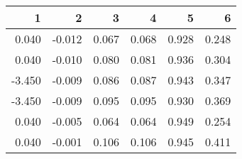 \begin{table}[ht]
\centering
\begin{tabular}{rrrrrr}
  \hline
1 & 2 & 3 & 4 & 5 & 6 \\ 
  \hline
0.040 & -0.012 & 0.067 & 0.068 & 0.928 & 0.248 \\ 
  0.040 & -0.010 & 0.080 & 0.081 & 0.936 & 0.304 \\ 
  -3.450 & -0.009 & 0.086 & 0.087 & 0.943 & 0.347 \\ 
  -3.450 & -0.009 & 0.095 & 0.095 & 0.930 & 0.369 \\ 
  0.040 & -0.005 & 0.064 & 0.064 & 0.949 & 0.254 \\ 
  0.040 & -0.001 & 0.106 & 0.106 & 0.945 & 0.411 \\ 
   \hline
\end{tabular}
\end{table}
